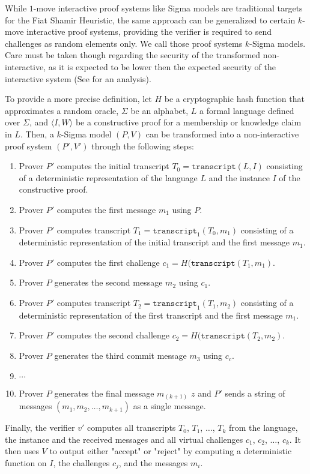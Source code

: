 While $1$-move interactive proof systems like Sigma models are traditional targets for the Fiat Shamir Heuristic, the same approach can be generalized to certain $k$-move interactive proof systems, providing the verifier is required to send challenges as random elements only. We call those proof systems $k$-Sigma models. Care must be taken though regarding the security of the transformed non-interactive, as it is expected to be lower then the expected security of the interactive system (See \cite{attema-21} for an analysis). 

To provide a more precise definition, let $H$ be a cryptographic hash function that approximates a random oracle, $\Sigma$ be an alphabet, $L$ a formal language defined over $\Sigma$, and $\langle I, W\rangle$ be a constructive proof for a membership or knowledge claim in $L$. Then, a $k$-Sigma model $(P,V)$ can be transformed into a non-interactive proof system $(P',V')$ through the following steps:
\begin{enumerate}
\label{def_sigma-model-fiat-shamir}
\item Prover $P'$ computes the initial transcript $T_0=\mathtt{transcript}(L,I)$ consisting of a deterministic representation of the language $L$ and the instance $I$ of the constructive proof.
\item Prover $P'$ computes the first message $m_1$ using $P$.
\item Prover $P'$ computes transcript $T_1=\mathtt{transcript}_1(T_0,m_1)$ consisting of a deterministic representation of the initial transcript and the first message $m_1$.
\item Prover $P'$ computes the first challenge $c_1=H(\mathtt{transcript}(T_1,m_1)$.
\item Prover $P$ generates the second message $m_2$ using $c_1$.

\item Prover $P'$ computes transcript $T_2=\mathtt{transcript}_1(T_1,m_2)$ consisting of a deterministic representation of the first transcript and the first message $m_1$.
\item Prover $P'$ computes the second challenge $c_2=H(\mathtt{transcript}(T_2,m_2)$.
\item Prover $P$ generates the third commit message $m_3$ using $c_c$.
\item $\cdots$
\item Prover $P$ generates the final message $m_{(k+1)}$ $z$ and $P'$ sends a string of messages
$(m_1,m_2,\ldots,m_{k+1})$ as a single message.
\end{enumerate}
Finally, the verifier $v'$ computes all transcripts $T_0$, $T_1$, $\ldots$, $T_k$ from the language, the instance and the received messages and all virtual challenges $c_1$, $c_2$, $\ldots$, $c_k$. It then uses
$V$ to output either "accept" or "reject" by computing a deterministic function on $I$, the challenges $c_j$, and the messages $m_i$.


